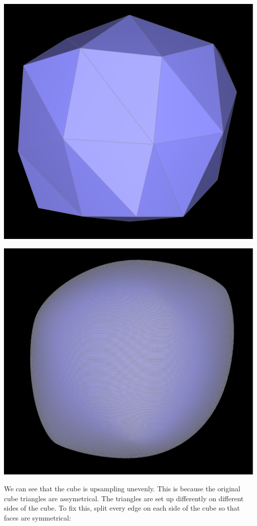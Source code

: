 \documentclass{article}
\begin{document}
\begin{center}
    \includegraphics[]{task 6/cube3.png}

    \includegraphics[]{task 6/cubeend.png}
\end{center}
We can see that the cube is upsampling unevenly. This is because the original cube triangles are assymetrical. The triangles are set up differently on different sides of the cube. To fix this, split every edge on each side of the cube so that faces are symmetrical:
\end{document}
